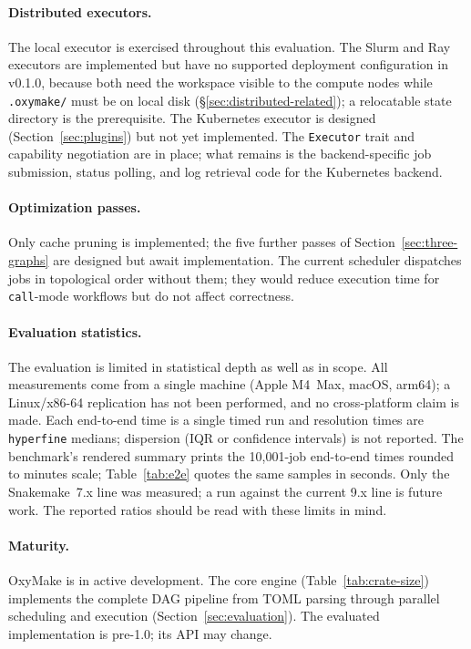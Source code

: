 \documentclass[12pt,a4paper]{article}
\newcommand{\code}[1]{{\texttt{\small\color{inlinecode}#1}}}
\begin{document}
\paragraph{Distributed executors.}
The local executor is exercised throughout this evaluation. The Slurm
and Ray executors are implemented but have no supported deployment
configuration in v0.1.0, because both need the workspace visible to the
compute nodes while \code{.oxymake/} must be on local disk
(\S\ref{sec:distributed-related}); a relocatable state directory is the
prerequisite. The Kubernetes
executor is designed (Section~\ref{sec:plugins}) but not yet implemented.
The \code{Executor} trait and capability negotiation are in place; what
remains is the backend-specific job submission, status polling, and log
retrieval code for the Kubernetes backend.

\paragraph{Optimization passes.}
Only cache pruning is implemented; the five further passes of
Section~\ref{sec:three-graphs} are designed but await implementation.
The current scheduler dispatches jobs in topological order without
them; they would reduce execution time for \code{call}-mode workflows
but do not affect correctness.

\paragraph{Evaluation statistics.}
The evaluation is limited in statistical depth as well as in scope.
All measurements come from a single machine (Apple M4~Max, macOS,
arm64); a Linux/x86-64 replication has not been performed, and no
cross-platform claim is made. Each end-to-end time is a single timed
run and resolution times are \code{hyperfine} medians; dispersion
(IQR or confidence intervals) is not reported. The benchmark's
rendered summary prints the 10{,}001-job end-to-end times rounded to
minutes scale; Table~\ref{tab:e2e} quotes the same samples in seconds.
Only the Snakemake~7.x line was measured; a run against the current 9.x
line is future work. The reported ratios
should be read with these limits in mind.

\paragraph{Maturity.}
OxyMake is in active development. The core engine
(Table~\ref{tab:crate-size}) implements the complete DAG pipeline from
TOML parsing through parallel scheduling and execution
(Section~\ref{sec:evaluation}). The evaluated
implementation is pre-1.0; its API may change.
\end{document}

